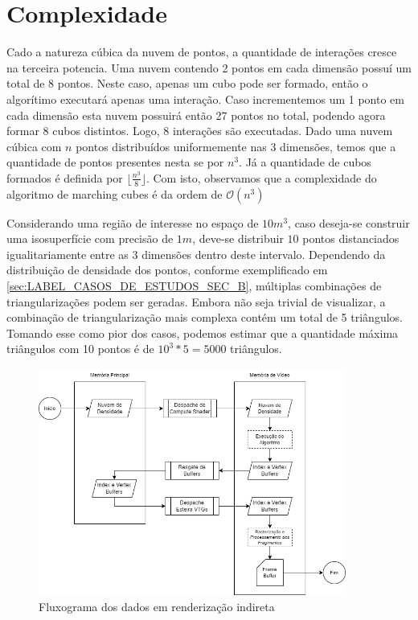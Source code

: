 \section{Complexidade}\label{sec:LABEL_CASOS_DE_ESTUDOS_SEC_D}

Cado a natureza cúbica da nuvem de pontos, a quantidade de interações cresce na terceira potencia. Uma nuvem contendo 2 pontos em cada dimensão possuí um total de 8 pontos. Neste caso, apenas um cubo pode ser formado, então o algorítimo executará apenas uma interação. Caso incrementemos um 1 ponto em cada dimensão esta nuvem possuirá então 27 pontos no total, podendo agora formar 8 cubos distintos. Logo, 8 interações são executadas. Dado uma nuvem cúbica com $n$ pontos distribuídos uniformemente nas 3 dimensões, temos que a quantidade de pontos presentes nesta se por $n ^ 3$. Já a quantidade de cubos formados é definida por $\lfloor\frac{n ^ 3}{8}\rfloor$. Com isto, observamos que a complexidade do algoritmo de marching cubes é da ordem de $\mathcal{O}(n^3)$

Considerando uma região de interesse no espaço de $10m^3$, caso deseja-se construir uma isosuperfície com precisão de $1m$, deve-se distribuir $10$ pontos distanciados igualitariamente entre as 3 dimensões dentro deste intervalo. Dependendo da distribuição de densidade dos pontos, conforme exemplificado em \ref{sec:LABEL_CASOS_DE_ESTUDOS_SEC_B}, múltiplas combinações de triangularizações podem ser geradas. Embora não seja trivial de visualizar, a combinação de triangularização mais complexa contém um total de 5 triângulos. Tomando esse como pior dos casos, podemos estimar que a quantidade máxima triângulos com 10 pontos é de $10^3*5 = 5000$ triângulos.

\begin{figure}
\centering
\includegraphics[width=0.9\textwidth]{imagens/FluxoDados-RendIndireta.drawio.png}
\caption{Fluxograma dos dados em renderização indireta}
\label{fig:LABEL_FIG_REND_INDIRETA}
\end{figure}

